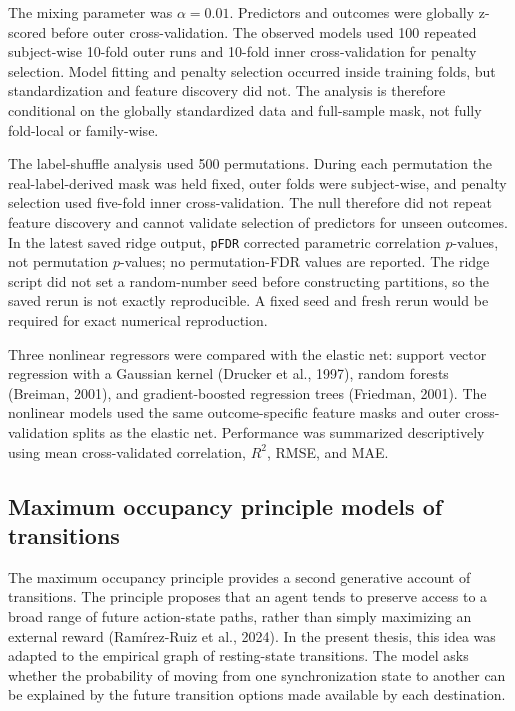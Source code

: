 \documentclass[12pt,a4paper]{report}
\begin{document}
The mixing parameter was $\alpha=0.01$. Predictors and outcomes were globally z-scored before outer cross-validation. The observed models used 100 repeated subject-wise 10-fold outer runs and 10-fold inner cross-validation for penalty selection. Model fitting and penalty selection occurred inside training folds, but standardization and feature discovery did not. The analysis is therefore conditional on the globally standardized data and full-sample mask, not fully fold-local or family-wise.


The label-shuffle analysis used 500 permutations. During each permutation the real-label-derived mask was held fixed, outer folds were subject-wise, and penalty selection used five-fold inner cross-validation. The null therefore did not repeat feature discovery and cannot validate selection of predictors for unseen outcomes. In the latest saved ridge output, \texttt{pFDR} corrected parametric correlation $p$-values, not permutation $p$-values; no permutation-FDR values are reported. The ridge script did not set a random-number seed before constructing partitions, so the saved rerun is not exactly reproducible. A fixed seed and fresh rerun would be required for exact numerical reproduction.

Three nonlinear regressors were compared with the elastic net: support vector regression
with a Gaussian kernel (Drucker et al., 1997), random forests (Breiman, 2001), and
gradient-boosted regression trees (Friedman, 2001). The nonlinear models used the same
outcome-specific feature masks and outer cross-validation splits as the elastic net.
Performance was summarized descriptively using mean cross-validated correlation, \(R^2\),
RMSE, and MAE.

\subsection{Maximum occupancy principle models of transitions}

The maximum occupancy principle provides a second generative account of transitions. The principle proposes that an agent tends to preserve access to a broad range of future action-state paths, rather than simply maximizing an external reward (Ramírez-Ruiz et al., 2024). In the present thesis, this idea was adapted to the empirical graph of resting-state transitions. The model asks whether the probability of moving from one synchronization state to another can be explained by the future transition options made available by each destination.
\end{document}
